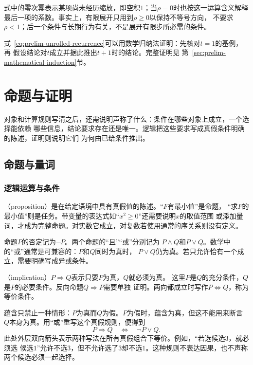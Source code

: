 式中的零次幂表示某项尚未经历缩放，即空积$1$；当$\rho=0$时也按这一运算含义解释
最后一项的系数。事实上，有限展开只用到$\rho\geq0$以保持不等号方向，
不要求$\rho<1$；后一个条件与长期行为有关，不是展开有限步所必需的条件。

式~\eqref{eq:prelim-unrolled-recurrence}可以用数学归纳法证明：先核对$t=1$的基例，再
假设结论对$t$成立并据此推出$t+1$时的结论。完整证明见
第~\ref{sec:prelim-mathematical-induction}节。

\section{命题与证明}
\label{sec:prelim-propositions-quantifiers}

对象和计算规则写清之后，还需说明声称了什么：条件在哪些对象上成立，一个选择能依赖
哪些信息，结论要求存在还是唯一。逻辑把这些要求写成真假条件明确的陈述，证明则说明它们
为何由已给条件推出。

\subsection{命题与量词}
\label{sec:prelim-statements-quantifiers}

\subsubsection{逻辑运算与条件}
\label{sec:prelim-logical-connectives}

（proposition）是在给定语境中具有真假值的陈述。“$F$有最小值”是命题，
“求$F$的最小值”则是任务。带变量的表达式如“$x^2\geq0$”还需要说明$x$的取值范围
或添加量词，才成为完整命题。对实数它成立，对复数若使用通常的序关系则没有定义。

命题$P$的否定记为$\neg P$。两个命题的“且”“或”分别记为
$P\land Q$和$P\lor Q$。数学中的“或”通常是可兼容的：$P$和$Q$同时为真时，
$P\lor Q$仍为真。若只允许恰有一个成立，需要明确写成异或条件。

（implication）$P\Rightarrow Q$表示只要$P$为真，$Q$就必须为真。
这里$P$是$Q$的充分条件，$Q$是$P$的必要条件。反向命题$Q\Rightarrow P$需要单独
证明。两向都成立时写作$P\Leftrightarrow Q$，称为等价条件。

蕴含只禁止一种情形：$P$为真而$Q$为假。$P$为假时，蕴含为真，但这不能用来断言
$Q$本身为真。用“或”重写这个真假规则，便得到
\begin{equation}
  P\Rightarrow Q\quad\Longleftrightarrow\quad\neg P\lor Q.
  \label{eq:comb-implication-clause}
\end{equation}
此处外层双向箭头表示两种写法在所有真假组合下等价。例如，“若选候选$3$，就必须选
候选$1$”允许不选$3$，但不允许选了$3$却不选$1$。这种规则不表达因果，也不声称
两个候选必须一起选择。

